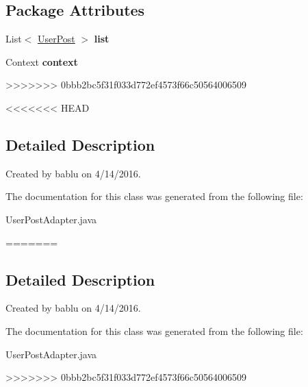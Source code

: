 \subsection*{\-Package \-Attributes}
\begin{DoxyCompactItemize}
\item 
\hypertarget{classcom_1_1example_1_1sel_1_1lostfound_1_1UserPostAdapter_aab2d1adac92f633215f374dae4121b24}{\-List$<$ \hyperlink{classcom_1_1example_1_1sel_1_1lostfound_1_1UserPost}{\-User\-Post} $>$ {\bfseries list}}\label{classcom_1_1example_1_1sel_1_1lostfound_1_1UserPostAdapter_aab2d1adac92f633215f374dae4121b24}

\item 
\hypertarget{classcom_1_1example_1_1sel_1_1lostfound_1_1UserPostAdapter_a44c4d98ed12da072b0e7702a5bd7d3ac}{\-Context {\bfseries context}}\label{classcom_1_1example_1_1sel_1_1lostfound_1_1UserPostAdapter_a44c4d98ed12da072b0e7702a5bd7d3ac}
>>>>>>> 0bbb2bc5f31f033d772ef4573f66c50564006509

\end{DoxyCompactItemize}


<<<<<<< HEAD
\subsection{Detailed Description}
Created by bablu on 4/14/2016. 

The documentation for this class was generated from the following file\-:\begin{DoxyCompactItemize}
\item 
User\-Post\-Adapter.\-java\end{DoxyCompactItemize}
=======
\subsection{\-Detailed \-Description}
\-Created by bablu on 4/14/2016. 

\-The documentation for this class was generated from the following file\-:\begin{DoxyCompactItemize}
\item 
\-User\-Post\-Adapter.\-java\end{DoxyCompactItemize}
>>>>>>> 0bbb2bc5f31f033d772ef4573f66c50564006509
